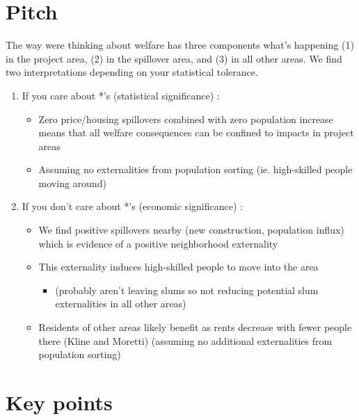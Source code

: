 \documentclass[12pt]{article}
\begin{document}
\section*{ Pitch }

The way were thinking about welfare has three components what's happening (1) in the project area, (2) in the spillover area, and (3) in all other areas.  We find two interpretations depending on your statistical tolerance.
\begin{enumerate}
\item If you care about *'s (statistical significance) :
\begin{itemize}
	\item Zero price/housing spillovers combined with zero population increase means that all welfare consequences can be confined to impacts in project areas
	\item Assuming no externalities from population sorting (ie. high-skilled people moving around)
\end{itemize}
\item If you don't care about *'s (economic significance) :
\begin{itemize}
	\item We find positive spillovers nearby (new construction, population influx) which is evidence of a positive neighborhood externality
	\item This externality induces high-skilled people to move into the area  
		\begin{itemize}
			\item (probably aren't leaving slums so not reducing potential slum externalities in all other areas)
		\end{itemize}
	\item Residents of other areas likely benefit as rents decrease with fewer people there (Kline and Moretti) (assuming no additional externalities from population sorting)
\end{itemize}
\end{enumerate}



\section*{Key points}
\end{document}
